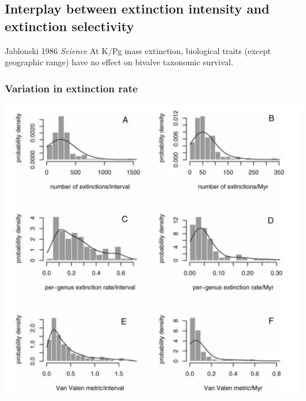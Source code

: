 \documentclass{beamer}
\begin{document}
\subsection{Interplay between extinction intensity and extinction selectivity}

\begin{frame}
  \begin{alertblock}{Jablonski 1986 \em{Science}}
    At K/Pg mass extinction, biological traits (except geographic range) have no effect on \alert{bivalve} taxonomic survival.
  \end{alertblock}

\end{frame}


\begin{frame}
  \frametitle{Variation in extinction rate}
  \begin{center}
    \includegraphics[width = \textwidth,height = 0.8\textheight,keepaspectratio = true]{figure/wang_extinction}
  \end{center}

  \tiny{}
\end{frame}
\end{document}
